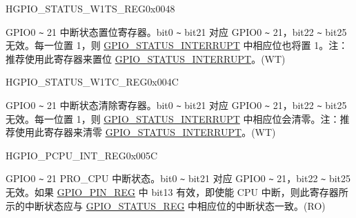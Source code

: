\begin{register}{H}{GPIO\_STATUS\_W1TS\_REG}{0x0048}\label{regdesc:GPIOSTATUSW1TSREG}
%
%
\regnewline%
\begin{regdesc}\begin{reglist}
\label{fielddesc:GPIOSTATUSW1TS}\item [GPIO\_STATUS\_W1TS] GPIO0 \verb+~+ 21 中断状态置位寄存器。bit0 \verb+~+ bit21 对应 GPIO0 \verb+~+ 21，bit22 \verb+~+ bit25 无效。每一位置 1，则 \hyperref[fielddesc:GPIOSTATUSINTERRUPT]{GPIO\_STATUS\_INTERRUPT} 中相应位也将置 1。注：推荐使用此寄存器来置位 \hyperref[fielddesc:GPIOSTATUSINTERRUPT]{GPIO\_STATUS\_INTERRUPT}。(WT)
\end{reglist}\end{regdesc}
\end{register}


\begin{register}{H}{GPIO\_STATUS\_W1TC\_REG}{0x004C}\label{regdesc:GPIOSTATUSW1TCREG}
%
%
\regnewline%
\begin{regdesc}\begin{reglist}
\label{fielddesc:GPIOSTATUSW1TC}\item [GPIO\_STATUS\_W1TC] GPIO0 \verb+~+ 21 中断状态清除寄存器。bit0 \verb+~+ bit21 对应 GPIO0 \verb+~+ 21，bit22 \verb+~+ bit25 无效。每一位置 1，则 \hyperref[fielddesc:GPIOSTATUSINTERRUPT]{GPIO\_STATUS\_INTERRUPT} 中相应位会清零。注：推荐使用此寄存器来清零 \hyperref[fielddesc:GPIOSTATUSINTERRUPT]{GPIO\_STATUS\_INTERRUPT}。(WT)
\end{reglist}\end{regdesc}
\end{register}


\begin{register}{H}{GPIO\_PCPU\_INT\_REG}{0x005C}\label{regdesc:GPIOPCPUINTREG}
%
%
\regnewline%
\begin{regdesc}\begin{reglist}
\label{fielddesc:GPIOPROCPUINT}\item [GPIO\_PROCPU\_INT]

GPIO0 \verb+~+ 21 PRO\_CPU 中断状态。bit0 \verb+~+ bit21 对应 GPIO0 \verb+~+ 21，bit22 \verb+~+ bit25 无效。如果 \hyperref[regdesc:GPIOPINNREG]{GPIO\_PIN\_REG} 中 bit13 有效，即使能 CPU 中断，则此寄存器所示的中断状态应与 \hyperref[regdesc:GPIOSTATUSREG]{GPIO\_STATUS\_REG} 中相应位的中断状态一致。(RO)
\end{reglist}\end{regdesc}
\end{register}



